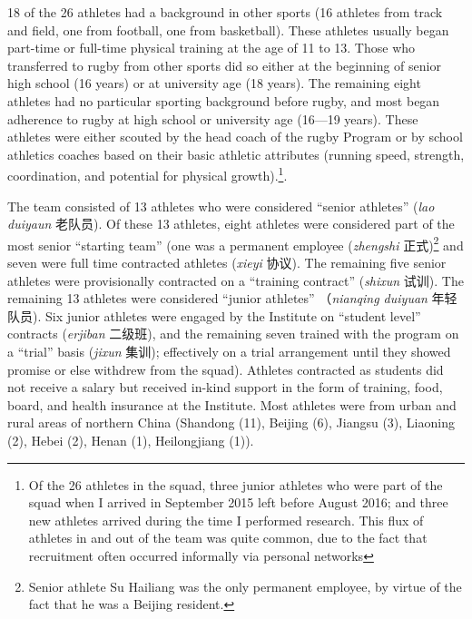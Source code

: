 \begin{CJK}{UTF8}{gbsn}
18 of the 26 athletes had a background in other sports (16 athletes from track and field, one from football, one from basketball).  These athletes usually began part-time or full-time physical training at the age of 11 to 13.  Those who transferred to rugby from other sports did so either at the beginning of senior high school (16 years) or at university age (18 years).  The remaining eight athletes had no particular sporting background before rugby, and most began adherence to rugby at high school or university age (16---19 years).  These athletes were either scouted by the head coach of the rugby Program or by school athletics coaches based on their basic athletic attributes (running speed, strength, coordination, and potential for physical growth).\footnote{Of the 26 athletes in the squad, three junior athletes who were part of the squad when I arrived in September 2015 left before August 2016; and three new athletes arrived during the time I performed research.  This flux of athletes in and out of the team was quite common, due to the fact that recruitment often occurred informally via personal networks}.

The team consisted of 13 athletes who were considered ``senior athletes'' (\textit{lao duiyaun} 老队员).  Of these 13 athletes, eight athletes were considered part of the most senior ``starting team''
(one was a permanent employee (\textit{zhengshi} 正式)\footnote{Senior athlete Su Hailiang was the only permanent employee, by virtue of the fact that he was a Beijing resident.} and seven were full time contracted athletes (\textit{xieyi} 协议). The remaining five senior athletes were provisionally contracted on a ``training contract'' (\textit{shixun} 试训).  The remaining 13 athletes were considered ``junior athletes'' （\textit{nianqing duiyuan} 年轻队员). Six junior athletes were engaged by the Institute on ``student level'' contracts (\textit{erjiban} 二级班), and the remaining seven trained with the program on a ``trial'' basis (\textit{jixun} 集训); effectively on a trial arrangement until they showed promise or else withdrew from the squad).  Athletes contracted as students did not receive a salary but received in-kind support in the form of training, food, board, and health insurance at the Institute.  Most athletes were from urban and rural areas of northern China (Shandong (11), Beijing (6), Jiangsu (3), Liaoning (2), Hebei (2), Henan (1), Heilongjiang (1)).



\end{CJK}
